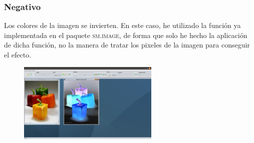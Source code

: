 \documentclass[11pt,a4paper]{article}
\begin{document}
\subsubsection{Negativo}
Los colores de la imagen se invierten. En este caso, he utilizado la función ya implementada en el paquete \textsc{sm.image}, de forma que solo he hecho la aplicación de dicha función, no la manera de tratar los pixeles de la imagen para conseguir el efecto.

\begin{figure}[H]
\centering
	\includegraphics[width=0.6\textwidth]{img/negativo.png}
\end{figure}
\end{document}
